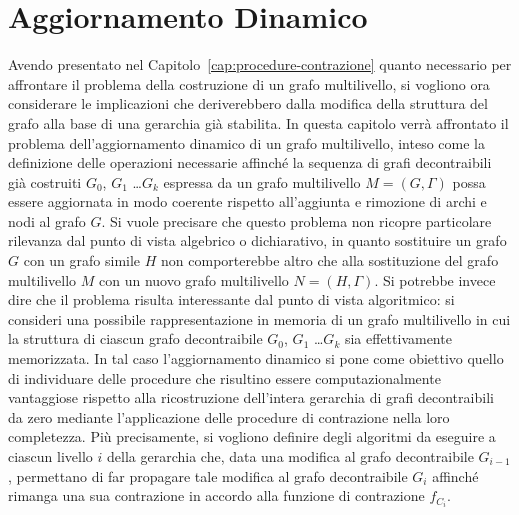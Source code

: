 \chapter{Aggiornamento Dinamico}\label{cap:aggiornamento-dinamico}

Avendo presentato nel Capitolo~\ref{cap:procedure-contrazione} quanto necessario per affrontare il problema
della costruzione di un grafo multilivello, si vogliono ora considerare le implicazioni che deriverebbero
dalla modifica della struttura del grafo alla base di una gerarchia già stabilita.
In questa capitolo verrà affrontato il problema dell'aggiornamento dinamico di un grafo multilivello, inteso
come la definizione delle operazioni necessarie affinché la sequenza di grafi decontraibili già costruiti
$G_0$, $G_1$ \ldots $G_k$ espressa da un grafo multilivello $M = (G, \Gamma)$ possa essere aggiornata in modo coerente
rispetto all'aggiunta e rimozione di archi e nodi al grafo $G$.
Si vuole precisare che questo problema non ricopre particolare rilevanza dal punto di vista algebrico o dichiarativo,
in quanto sostituire un grafo $G$ con un grafo simile $H$ non comporterebbe altro che alla sostituzione
del grafo multilivello $M$ con un nuovo grafo multilivello $N = (H, \Gamma)$.
Si potrebbe invece dire che il problema risulta interessante dal punto di vista algoritmico: si consideri una possibile
rappresentazione in memoria di un grafo multilivello in cui la struttura di ciascun grafo decontraibile
$G_0$, $G_1$ \ldots $G_k$ sia effettivamente memorizzata.
In tal caso l'aggiornamento dinamico si pone come obiettivo quello di individuare delle procedure che risultino
essere computazionalmente vantaggiose rispetto alla ricostruzione dell'intera gerarchia di grafi decontraibili da zero
mediante l'applicazione delle procedure di contrazione nella loro completezza. \newline
Più precisamente, si vogliono definire degli algoritmi da eseguire a ciascun livello $i$ della gerarchia che,
data una modifica al grafo decontraibile $G_{i-1}$, permettano di far propagare tale modifica al grafo
decontraibile $G_i$ affinché rimanga una sua contrazione in accordo alla funzione di contrazione $f_{C_i}$.

